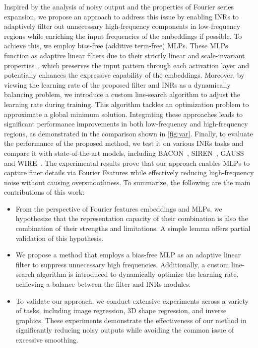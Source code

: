 Inspired by the analysis of noisy output and the properties of Fourier series expansion, we propose an approach to address this issue by enabling INRs to adaptively filter out unnecessary high-frequency components in low-frequency regions while enriching the input frequencies of the embeddings if possible.
%
To achieve this, we employ bias-free (additive term-free) MLPs. These MLPs function as adaptive linear filters due to their strictly linear and scale-invariant properties~\citep{mohan2019robust}, which preserves the input pattern through each activation layer and potentially enhances the expressive capability of the embeddings.
%
Moreover, by viewing the learning rate of the proposed filter and INRs as a dynamically balancing problem, we introduce a custom line-search algorithm to adjust the learning rate during training. This algorithm tackles an optimization problem to approximate a global minimum solution. Integrating these approaches leads to significant performance improvements in both low-frequency and high-frequency regions, as demonstrated in the comparison shown in \autoref{fig:var}.
%
Finally, to evaluate the performance of the proposed method, we test it on various INRs tasks and compare it with state-of-the-art models, including BACON~\citep{lindell2022bacon}, SIREN~\citep{sitzmann2020implicit}, GAUSS~\citep{ramasinghe2022beyond} and WIRE~\citep{saragadam2023wire}. 
The experimental results prove that our approach enables MLPs to capture finer details via Fourier Features while effectively reducing high-frequency noise without causing oversmoothness.
%
To summarize, the following are the main contributions of this work:
\begin{itemize}
    \item From the perspective of Fourier features embeddings and MLPs, we hypothesize that the representation capacity of their combination is also the combination of their strengths and limitations. A simple lemma offers partial validation of this hypothesis.

    
    \item  We propose a method that employs a bias-free MLP as an adaptive linear filter to suppress unnecessary high frequencies. Additionally, a custom line-search algorithm is introduced to dynamically optimize the learning rate, achieving a balance between the filter and INRs modules.

    \item To validate our approach, we conduct extensive experiments across a variety of tasks, including image regression, 3D shape regression, and inverse graphics. These experiments demonstrate the effectiveness of our method in significantly reducing noisy outputs while avoiding the common issue of excessive smoothing.
\end{itemize}
